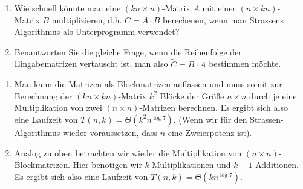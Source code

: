 
\begin{exercise}

\begin{enumerate}[label = (\alph*)]
  \item Wie schnell könnte man eine $(kn \times n)$-Matrix $A$ mit einer $(n \times kn)$-Matrix
  $B$ multiplizieren, d.h. $C = A \cdot B$ berechenen, wenn man Strassens Algorithmus als Unterprogramm verwendet?
  \item Benantworten Sie die gleiche Frage, wenn die Reihenfolge der Eingabematrizen vertauscht ist, man also
  $\tilde{C} = B \cdot A$ bestimmen möchte.
\end{enumerate}

\end{exercise}


\begin{solution}

\begin{enumerate}[label = (\alph*)]
  \item Man kann die Matrizen als Blockmatrizen auffassen und muss somit zur Berechnung der $(kn \times kn)$-Matrix $k^2$ Blöcke der Größe $n \times n$ durch je eine Multiplikation von zwei $(n \times n)$-Matrizen berechnen. Es ergibt sich also eine Laufzeit von $T(n,k) = \Theta(k^2n^{\log 7})$. (Wenn wir für den Strassen-Algorithmus wieder voraussetzen, dass $n$ eine Zweierpotenz ist).

  \item Analog zu oben betrachten wir wieder die Multiplikation von $(n \times n)$-Blockmatrizen. Hier benötigen wir $k$ Multiplikationen und $k-1$ Additionen. Es ergibt sich also eine Laufzeit von $T(n,k) = \Theta(kn^{\log 7})$.
\end{enumerate}

\end{solution}

